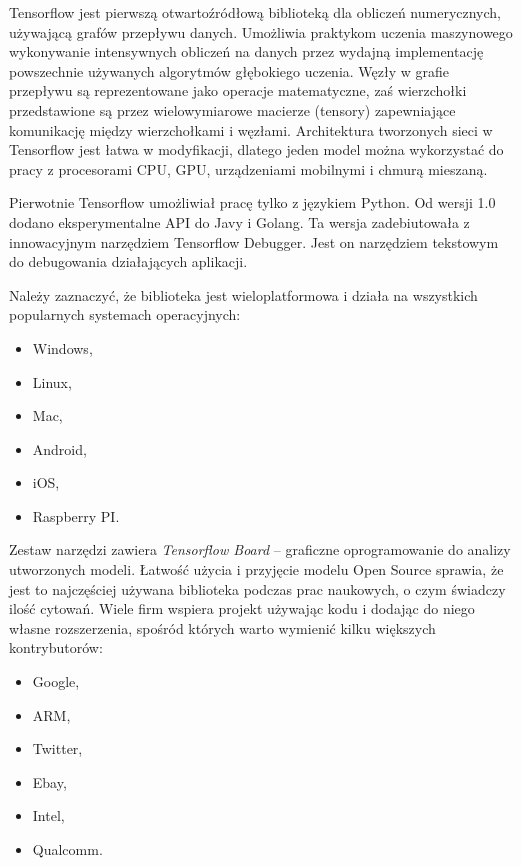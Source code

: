 \documentclass[12pt,a4paper,twoside,titlepage,openright]{book}
\begin{document}
\begin{itemize}
\begin{itemize}
Tensorflow jest pierwszą otwartoźródłową biblioteką dla obliczeń numerycznych, używającą grafów przepływu danych. Umożliwia praktykom uczenia maszynowego wykonywanie intensywnych obliczeń na danych przez wydajną implementację powszechnie używanych algorytmów głębokiego uczenia. Węzły w grafie przepływu są reprezentowane jako operacje matematyczne, zaś wierzchołki przedstawione są przez wielowymiarowe macierze (tensory) zapewniające komunikację między wierzchołkami i węzłami. Architektura tworzonych sieci w Tensorflow jest łatwa w modyfikacji, dlatego jeden model można wykorzystać do pracy z procesorami CPU, GPU, urządzeniami mobilnymi i chmurą mieszaną. \cite{DeepLearningTensorflow}

Pierwotnie Tensorflow umożliwiał pracę tylko z językiem Python. Od wersji 1.0 dodano eksperymentalne API do Javy i Golang. Ta wersja zadebiutowała z innowacyjnym narzędziem Tensorflow Debugger. Jest on narzędziem tekstowym do debugowania działających aplikacji.

Należy zaznaczyć, że biblioteka jest wieloplatformowa i działa na wszystkich popularnych systemach operacyjnych:
\begin{itemize}
\item Windows,
\item Linux,
\item Mac,
\item Android,
\item iOS,
\item Raspberry PI.
\end{itemize}

Zestaw narzędzi zawiera \textit{Tensorflow Board} -- graficzne oprogramowanie do analizy utworzonych modeli. Łatwość użycia i przyjęcie modelu Open Source sprawia, że jest to najczęściej używana biblioteka podczas prac naukowych, o czym świadczy ilość cytowań. \cite{siteTensorflowCitations} Wiele firm wspiera projekt używając kodu i dodając do niego własne rozszerzenia, spośród których warto wymienić kilku większych kontrybutorów:
\begin{itemize}
\item Google,
\item ARM,
\item Twitter,
\item Ebay,
\item Intel,
\item Qualcomm.
\end{itemize}


\end{itemize}
\end{itemize}
\end{document}
